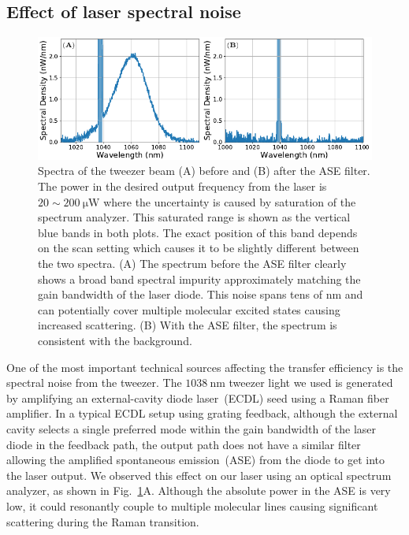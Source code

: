 \subsection{Effect of laser spectral noise}
\label{ch:raman-transfer:results:ase}

\begin{figure}
  \centering
  \includegraphics[width=\textwidth]{figures/raman_transfer_spectra.pdf}
  \caption[Tweezer spectra before and after ASE filter.]{
    Spectra of the tweezer beam (A) before and (B) after the ASE filter.
    The power in the desired output frequency from the laser is $20\sim200~\mathrm{\mu W}$
    where the uncertainty is caused by saturation of the spectrum analyzer.
    This saturated range is shown as the vertical blue bands in both plots.
    The exact position of this band depends on the scan setting
    which causes it to be slightly different between the two spectra.
    (A) The spectrum before the ASE filter clearly shows a broad band spectral impurity
    approximately matching the gain bandwidth of the laser diode.
    This noise spans tens of nm and can potentially cover multiple molecular excited states
    causing increased scattering.
    (B) With the ASE filter, the spectrum is consistent with the background.
    \label{fig:raman-transfer:results:ase:spectra}}
\end{figure}

One of the most important technical sources affecting the transfer efficiency
is the spectral noise from the tweezer.
The $1038~\mathrm{nm}$ tweezer light we used is generated
by amplifying an external-cavity diode laser~(ECDL) seed using a Raman fiber amplifier.
In a typical ECDL setup using grating feedback,
although the external cavity selects a single preferred mode
within the gain bandwidth of the laser diode in the feedback path,
the output path does not have a similar filter
allowing the amplified spontaneous emission~(ASE)
from the diode to get into the laser output.
We observed this effect on our laser using an optical spectrum analyzer,
as shown in Fig.~\ref{fig:raman-transfer:results:ase:spectra}A.
Although the absolute power in the ASE is very low,
it could resonantly couple to multiple molecular lines
causing significant scattering during the Raman transition.


